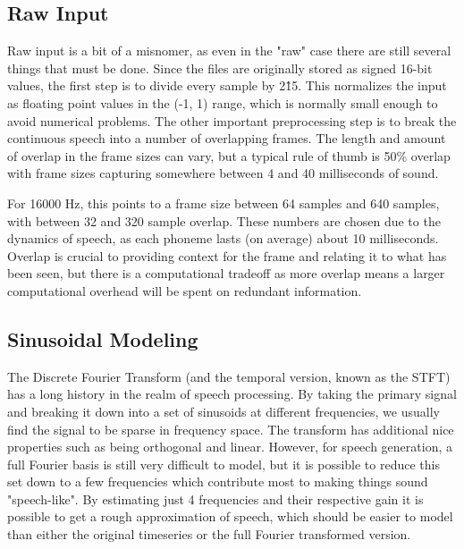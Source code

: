 \documentclass{article} %
\begin{document}
\subsection{Raw Input}
Raw input is a bit of a misnomer, as even in the "raw" case there are still
several things that must be done. Since the files are originally stored
as signed 16-bit values, the first step is to divide every sample by 2\^15.
This normalizes the input as floating point values in the (-1, 1) range, which
is normally small enough to avoid numerical problems. The other important
preprocessing step is to break the continuous speech into a number of
overlapping frames. The length and amount of overlap in the frame sizes can
vary, but a typical rule of thumb is 50\% overlap with frame sizes
capturing somewhere between 4 and 40 milliseconds of sound.
\par
For 16000 Hz,
this points to a frame size between 64 samples and 640 samples, with between
32 and 320 sample overlap. These numbers are chosen due to the dynamics of
speech, as each phoneme lasts (on average) about 10 milliseconds. Overlap is
crucial to providing context for the frame and relating it to what has been
seen, but there is a computational tradeoff as more overlap means
a larger computational overhead will be spent on redundant information.

\subsection{Sinusoidal Modeling}
The Discrete Fourier Transform (and the temporal version, known as the STFT)
has a long history in the realm of speech
processing. By taking the primary signal and breaking it down into a set of
sinusoids at different frequencies, we usually find the signal to be sparse in
frequency space. The transform has 
additional nice properties such as being orthogonal and linear. However, for
speech generation, a full Fourier basis is still very difficult to model, but it
is possible to reduce this set down to a few frequencies which contribute
most to making things sound
"speech-like". By estimating just 4 frequencies and their respective
gain it is possible to get a rough approximation of speech, which should be
easier to model than either the original timeseries or the full Fourier
transformed version.
\end{document}
